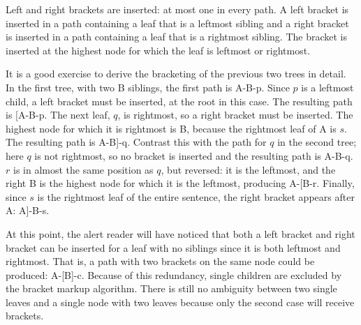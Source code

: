 \documentclass[11pt,letterpaper]{article}
\begin{document}
Left and right brackets are inserted: at most one
in every path. A left bracket is inserted in a path containing a leaf
that is a leftmost sibling and a right bracket is inserted in a path
containing a leaf that is a rightmost sibling. The bracket is inserted
at the highest node for which the leaf is leftmost or rightmost.

It is a good exercise to derive the bracketing of the previous two trees in detail.
In the first tree, with two B
siblings, the first path is A-B-p. Since $p$ is a leftmost child,
a left bracket must be inserted, at the root in this case. The
resulting path is [A-B-p. The next leaf, $q$, is rightmost, so a right
bracket must be inserted. The highest node for which it is rightmost
is B, because the rightmost leaf of A is $s$. The resulting path is
A-B]-q. Contrast this with the path for $q$ in the second tree; here $q$
is not rightmost, so no bracket is inserted and the resulting path is
A-B-q. $r$ is in almost the same position as $q$, but reversed: it is the
leftmost, and the right B is the highest node for which it is the
leftmost, producing A-[B-r. Finally, since $s$ is the rightmost leaf of
the entire sentence, the right bracket appears after A: A]-B-s.

At this point, the alert reader will have
noticed that both a left bracket and right bracket can be inserted for
a leaf with no siblings since it is both leftmost and rightmost. That is,
a path with two brackets on the same node could be produced: A-[B]-c. Because
of this redundancy, single children are
excluded by the bracket markup algorithm. There is still
no ambiguity between two single leaves and a single node with two
leaves because only the second case will receive brackets.



\end{document}
